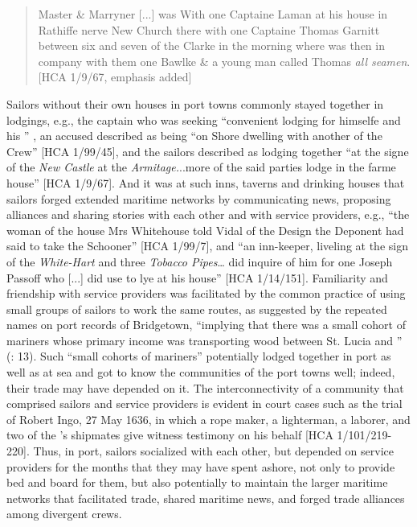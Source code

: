 \begin{quotation}
Master \& Marryner [...] was With one Captaine Laman at his house in Rathiffe nerve New Church there with one Captaine Thomas Garnitt between six and seven of the Clarke in the morning where was then in company with them one Bawlke \& a young man called Thomas \textit{all seamen}. [HCA 1/9/67, emphasis added] 
\end{quotation}

Sailors without their own houses in port towns commonly stayed together in lodgings, e.g., the captain who was seeking “convenient lodging for himselfe and his ” \citep[11]{Gage1648}, an accused  described as being “on Shore dwelling with another of the Crew” [HCA 1/99/45], and the sailors described as lodging together “at the signe of the \textit{New Castle} at the \textit{Armitage.}..more of the said parties lodge in the farme house” [HCA 1/9/67]. And it was at such inns, taverns and drinking houses that sailors forged extended maritime networks by communicating news, proposing alliances and sharing stories with each other and with service providers, e.g., “the woman of the house Mrs Whitehouse told Vidal of the Design the Deponent had said to take the Schooner” [HCA 1/99/7], and “an inn-keeper, liveling at the sign of the \textit{White-Hart} and three \textit{Tobacco Pipes}… did inquire of him for one Joseph Passoff who [...] did use to lye at his house” [HCA 1/14/151]. Familiarity and friendship with service providers was facilitated by the common practice of using small groups of sailors to work the same routes, as suggested by the repeated names on port records of Bridgetown, “implying that there was a small cohort of mariners whose primary income was transporting wood between St. Lucia and ” (\citealt{Draper2016}: 13). Such “small cohorts of mariners” potentially lodged together in port as well as at sea and got to know the communities of the port towns well; indeed, their trade may have depended on it. The interconnectivity of a community that comprised sailors and service providers is evident in court cases such as the trial of Robert Ingo, 27 May {1636}, in which a rope maker, a lighterman, a laborer, and two of the ’s shipmates give witness testimony on his behalf [HCA 1/101/219-220]. Thus, in port, sailors socialized with each other, but depended on service providers for the months that they may have spent ashore, not only to provide bed and board for them, but also potentially to maintain the larger maritime networks that facilitated trade, shared maritime news, and forged trade alliances among divergent crews. 

